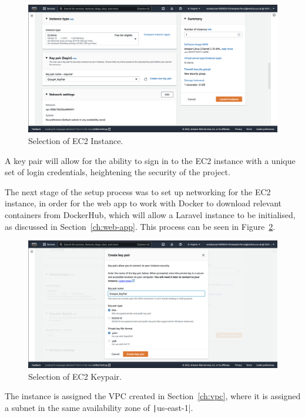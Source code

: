 \clearpage
\begin{figure}[!htbp]
    \centering
    \includegraphics[width=\textwidth]{resources/ec2/create-instance-instance-type}
    \caption{Selection of EC2 Instance.}
    \label{fig:ec2-instance}
\end{figure}

A key pair will allow for the ability to sign in to the EC2 instance with a unique set of login credentials, heightening
the security of the project.

The next stage of the setup process was to set up networking for the EC2 instance, in order for the web app to work with
Docker to download relevant containers from DockerHub, which will allow a Laravel instance to be initialised, as
discussed in Section~\ref{ch:web-app}.
This process can be seen in Figure~\ref{fig:ec2-keypair}.

\begin{figure}[!htbp]
    \centering
    \includegraphics[width=\textwidth]{resources/ec2/create-key-pair}
    \caption{Selection of EC2 Keypair.}
    \label{fig:ec2-keypair}
\end{figure}

The instance is assigned the VPC created in Section~\ref{ch:vpc}, where it is assigned a subnet in the same
availability zone of \texttt|us-east-1|.

